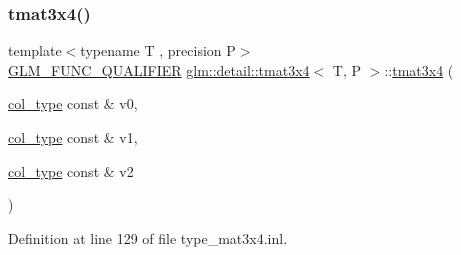\subsubsection{\texorpdfstring{tmat3x4()}{tmat3x4()}\hspace{0.1cm}{\footnotesize\ttfamily [7/22]}}
{\footnotesize\ttfamily template$<$typename T , precision P$>$ \\
\hyperlink{setup_8hpp_a33fdea6f91c5f834105f7415e2a64407}{G\+L\+M\+\_\+\+F\+U\+N\+C\+\_\+\+Q\+U\+A\+L\+I\+F\+I\+ER} \hyperlink{structglm_1_1detail_1_1tmat3x4}{glm\+::detail\+::tmat3x4}$<$ T, P $>$\+::\hyperlink{structglm_1_1detail_1_1tmat3x4}{tmat3x4} (\begin{DoxyParamCaption}\item[{\hyperlink{structglm_1_1detail_1_1tmat3x4_aadea597c799e263c7580c0291753d0de}{col\+\_\+type} const \&}]{v0,  }\item[{\hyperlink{structglm_1_1detail_1_1tmat3x4_aadea597c799e263c7580c0291753d0de}{col\+\_\+type} const \&}]{v1,  }\item[{\hyperlink{structglm_1_1detail_1_1tmat3x4_aadea597c799e263c7580c0291753d0de}{col\+\_\+type} const \&}]{v2 }\end{DoxyParamCaption})}



Definition at line 129 of file type\+\_\+mat3x4.\+inl.

\mbox{\label{structglm_1_1detail_1_1tmat3x4_a6fc2dce014e53c227b06f0ad379c92c0}} 
